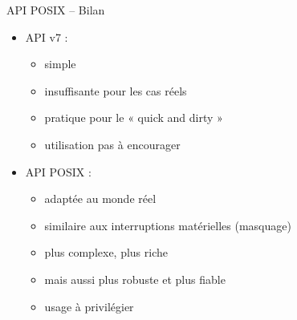 \begin {frame} {API POSIX -- Bilan}

    \begin {itemize}
	\item API v7 :
	    \begin {itemize}
		\item simple
		\item insuffisante pour les cas réels
		\item pratique pour le « quick and dirty »
		\item utilisation pas à encourager
	    \end {itemize}

	    \vspace* {2mm}

	\item API POSIX :
	    \begin {itemize}
		\item adaptée au monde réel
		\item similaire aux interruptions matérielles (masquage)
		\item plus complexe, plus riche
		\item mais aussi plus robuste et plus fiable
		\item usage à privilégier
	    \end {itemize}
    \end {itemize}
\end {frame}
